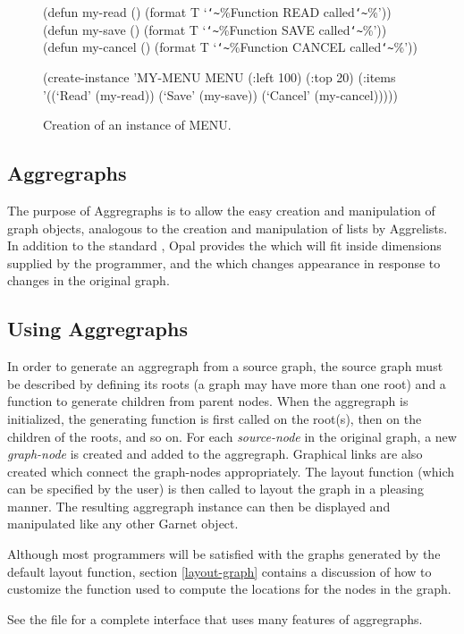 \begin{figure}
\begin{programexample}
(defun my-read () (format T `{\tt\char`\~}\%Function READ called{\tt\char`\~}\%'))
(defun my-save () (format T `{\tt\char`\~}\%Function SAVE called{\tt\char`\~}\%'))
(defun my-cancel () (format T `{\tt\char`\~}\%Function CANCEL called{\tt\char`\~}\%'))

(create-instance 'MY-MENU MENU
   (:left 100) (:top 20)
   (:items '((`Read' (my-read)) (`Save' (my-save))
             (`Cancel' (my-cancel)))))
\end{programexample}
\caption{Creation of an instance of MENU.}
\end{figure}


\begin{group}
\chapter{Aggregraphs}
\label{aggregraphs}

The purpose of Aggregraphs is to allow the easy
creation and manipulation of graph objects, analogous to the
creation and manipulation of lists by Aggrelists.  In addition to the standard
, Opal provides the  which will fit
inside dimensions supplied by the programmer, and the
 which changes appearance in response to
changes in the original graph.


\section{Using Aggregraphs}

In order to generate an aggregraph from a source graph, the source graph must
be described by defining its roots (a graph may have more than one root) and
a function to generate children from parent nodes.  When the
aggregraph is initialized, the generating function is first called on the
root(s), then on the children of the roots, and so on.  For each
{\it source-node} in the original graph, a new {\it graph-node} is created and
added to the aggregraph.  Graphical links are also created which connect the
graph-nodes appropriately.  The layout function (which can be specified by the
user) is then called to layout the graph in a pleasing manner.
The resulting aggregraph instance can then be displayed and manipulated
like any other Garnet object.

Although most
programmers will be satisfied with the graphs generated by the default layout
function, section \ref{layout-graph} contains a discussion of how to
customize the function used to compute the locations for the nodes in the
graph.

See the file  for a complete interface that uses many
features of aggregraphs.
\end{group}

